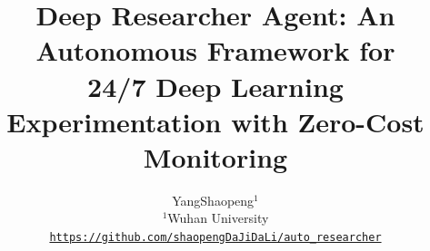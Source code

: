 \documentclass[10pt,twocolumn,letterpaper]{article}
\title{Deep Researcher Agent: An Autonomous Framework for \\24/7 Deep Learning Experimentation with Zero-Cost Monitoring}
\author{
    YangShaopeng$^{1}$\\
    $^{1}$Wuhan University\\
    {\tt\small \url{https://github.com/shaopengDaJiDaLi/auto_researcher}}
}
\begin{document}
\maketitle








{\small


}

\newpage
\appendix

\end{document}
